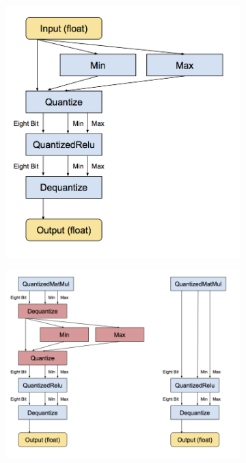 	\begin{figure}[h]
		\begin{subfigure}{.4\textwidth}
			\centering
			\includegraphics[width=1\linewidth]{images/quantization1}
			\caption{}
			\label{Fig:quantizationb}
		\end{subfigure}
		\begin{subfigure}{.6\textwidth}
			\centering
			\includegraphics[width=1\linewidth]{images/quantization2}

\end{subfigure}
\end{figure}

